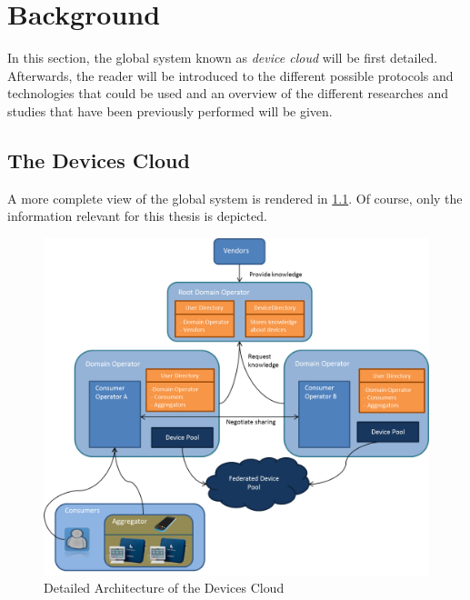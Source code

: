 \chapter{Background}
\label{cha:relatedwork}

In this section, the global system known as \emph{device cloud} will be first detailed. Afterwards, the reader will be introduced to the different possible protocols and technologies that could be used and an overview of the different researches and studies that have been previously performed will be given.
 
\section{The Devices Cloud}
A more complete view of the global system is rendered in \ref{fig:design_complete}. Of course, only the information relevant for this thesis is depicted.


\begin{figure}[!ht]
	\centering
	\includegraphics[width=1\textwidth]{images/design_complete}
	\caption{Detailed Architecture of the Devices Cloud}
	\label{fig:design_complete}
\end{figure}

